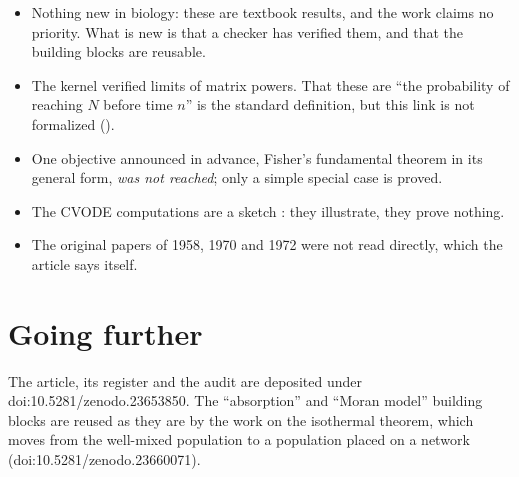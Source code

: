 \begin{limite}
\begin{itemize}
\item Nothing new in biology: these are textbook results, and the work claims no priority. What is new is that a
  checker has verified them, and that the building blocks are reusable.
\item The kernel verified limits of matrix powers. That these are ``the probability of reaching $N$ before time
  $n$'' is the standard definition, but this link is not formalized ().
\item One objective announced in advance, Fisher's fundamental theorem in its general form, \emph{was not
  reached}; only a simple special case is proved.
\item The CVODE computations are a sketch : they illustrate, they prove nothing.
\item The original papers of 1958, 1970 and 1972 were not read directly, which the article says itself.
\end{itemize}
\end{limite}

\section*{Going further}

The article, its register and the audit are deposited under doi:10.5281/\allowbreak zenodo.23653850. The
``absorption'' and ``Moran model'' building blocks are reused as they are by the work on the isothermal theorem,
which moves from the well-mixed population to a population placed on a network (doi:10.5281/zenodo.23660071).
